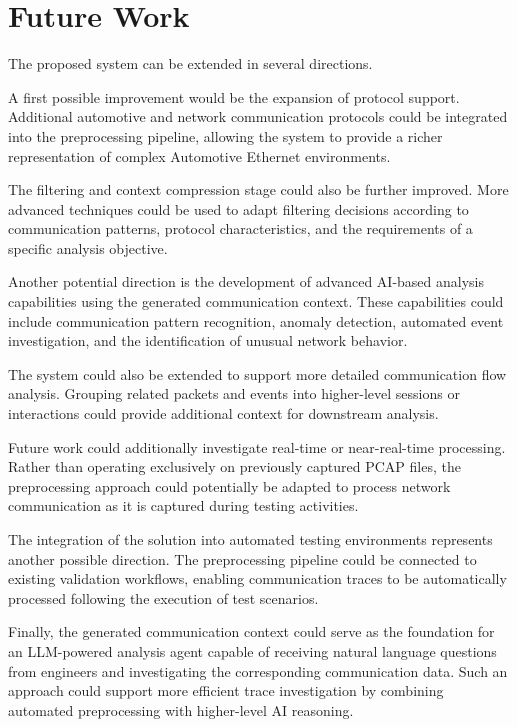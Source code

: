 \section{Future Work}

The proposed system can be extended in several directions.

A first possible improvement would be the expansion of protocol support. Additional automotive and network communication protocols could be integrated into the preprocessing pipeline, allowing the system to provide a richer representation of complex Automotive Ethernet environments.

The filtering and context compression stage could also be further improved. More advanced techniques could be used to adapt filtering decisions according to communication patterns, protocol characteristics, and the requirements of a specific analysis objective.

Another potential direction is the development of advanced AI-based analysis capabilities using the generated communication context. These capabilities could include communication pattern recognition, anomaly detection, automated event investigation, and the identification of unusual network behavior.

The system could also be extended to support more detailed communication flow analysis. Grouping related packets and events into higher-level sessions or interactions could provide additional context for downstream analysis.

Future work could additionally investigate real-time or near-real-time processing. Rather than operating exclusively on previously captured PCAP files, the preprocessing approach could potentially be adapted to process network communication as it is captured during testing activities.

The integration of the solution into automated testing environments represents another possible direction. The preprocessing pipeline could be connected to existing validation workflows, enabling communication traces to be automatically processed following the execution of test scenarios.

Finally, the generated communication context could serve as the foundation for an LLM-powered analysis agent capable of receiving natural language questions from engineers and investigating the corresponding communication data. Such an approach could support more efficient trace investigation by combining automated preprocessing with higher-level AI reasoning.

